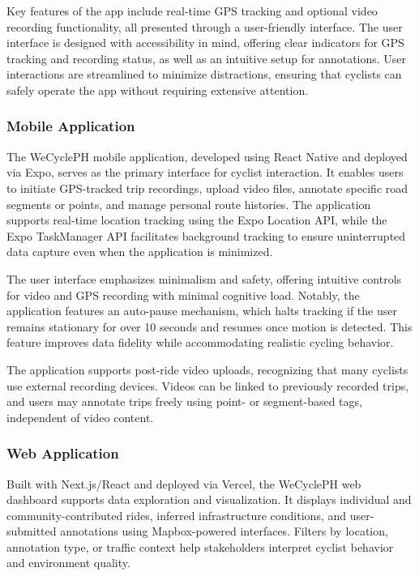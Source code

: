 Key features of the app include real-time GPS tracking and optional video recording functionality, all presented through a user-friendly interface. The user interface is designed with accessibility in mind, offering clear indicators for GPS tracking and recording status, as well as an intuitive setup for annotations. User interactions are streamlined to minimize distractions, ensuring that cyclists can safely operate the app without requiring extensive attention.

\subsubsection{Mobile Application}
The WeCyclePH mobile application, developed using React Native and deployed via Expo, serves as the primary interface for cyclist interaction. It enables users to initiate GPS-tracked trip recordings, upload video files, annotate specific road segments or points, and manage personal route histories. The application supports real-time location tracking using the Expo Location API, while the Expo TaskManager API facilitates background tracking to ensure uninterrupted data capture even when the application is minimized.

The user interface emphasizes minimalism and safety, offering intuitive controls for video and GPS recording with minimal cognitive load. Notably, the application features an auto-pause mechanism, which halts tracking if the user remains stationary for over 10 seconds and resumes once motion is detected. This feature improves data fidelity while accommodating realistic cycling behavior.

The application supports post-ride video uploads, recognizing that many cyclists use external recording devices. Videos can be linked to previously recorded trips, and users may annotate trips freely using point- or segment-based tags, independent of video content.

\subsubsection{Web Application}
Built with Next.js/React and deployed via Vercel, the WeCyclePH web dashboard supports data exploration and visualization. It displays individual and community-contributed rides, inferred infrastructure conditions, and user-submitted annotations using Mapbox-powered interfaces. Filters by location, annotation type, or traffic context help stakeholders interpret cyclist behavior and environment quality.


